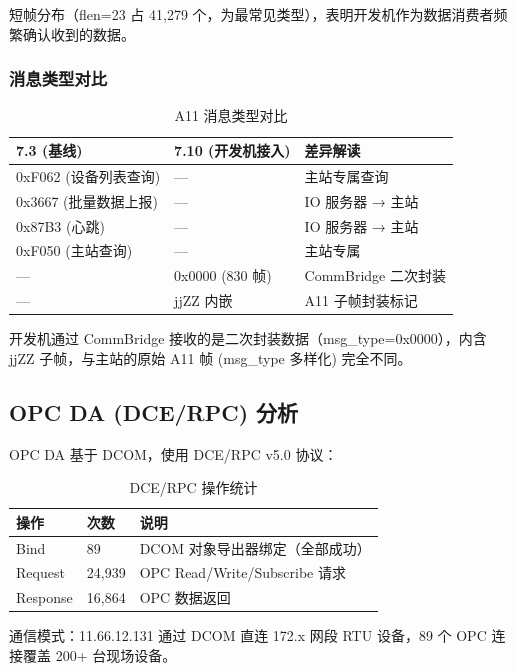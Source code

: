 \documentclass[12pt,a4paper]{ctexart}
\begin{document}
短帧分布（flen=23 占 41,279 个，为最常见类型），表明开发机作为数据消费者频繁确认收到的数据。

\subsubsection{消息类型对比}

\begin{table}[H]\centering
\caption{A11 消息类型对比}
\begin{tabular}{p{2.5cm} p{4cm} p{5cm}}
\toprule
\textbf{7.3 (基线)} & \textbf{7.10 (开发机接入)} & \textbf{差异解读} \\
\midrule
0xF062 (设备列表查询) & --- & 主站专属查询 \\
0x3667 (批量数据上报) & --- & IO 服务器 → 主站 \\
0x87B3 (心跳) & --- & IO 服务器 → 主站 \\
0xF050 (主站查询) & --- & 主站专属 \\
--- & 0x0000 (830 帧) & CommBridge 二次封装 \\
--- & jjZZ 内嵌 & A11 子帧封装标记 \\
\bottomrule
\end{tabular}
\end{table}

开发机通过 CommBridge 接收的是二次封装数据（msg\_type=0x0000），内含 jjZZ 子帧，与主站的原始 A11 帧 (msg\_type 多样化) 完全不同。

\subsection{OPC DA (DCE/RPC) 分析}

OPC DA 基于 DCOM，使用 DCE/RPC v5.0 协议：

\begin{table}[H]\centering
\caption{DCE/RPC 操作统计}
\begin{tabular}{p{3cm} p{2cm} p{8cm}}
\toprule
\textbf{操作} & \textbf{次数} & \textbf{说明} \\
\midrule
Bind & 89 & DCOM 对象导出器绑定（全部成功） \\
Request & 24,939 & OPC Read/Write/Subscribe 请求 \\
Response & 16,864 & OPC 数据返回 \\
\bottomrule
\end{tabular}
\end{table}

通信模式：11.66.12.131 通过 DCOM 直连 172.x 网段 RTU 设备，89 个 OPC 连接覆盖 200+ 台现场设备。
\end{document}
